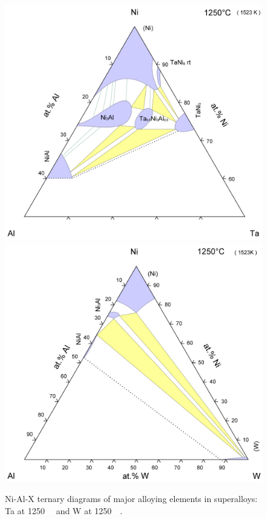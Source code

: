 %
\begin{figure}[H]
\begin{center}
\includegraphics[width=12cm]{NiAlTa1250}
\includegraphics[width=12cm]{NiAlW1250}
\caption{Ni-Al-X ternary diagrams of major alloying elements in superalloys: Ta at 1250\celsius\ ~\cite{willemin86} and W at 1250\celsius\ ~\cite{alekseeva93}.}
\label{fig:SLi}
\end{center}
\end{figure}
%
